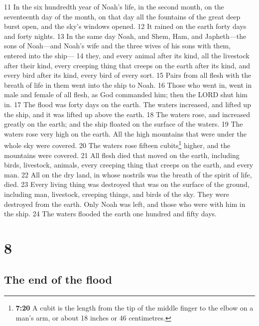{11} In the six hundredth year of Noah's life, in the second month, on
the seventeenth day of the month, on that day all the fountains of the
great deep burst open, and the sky's windows opened. {12} It rained on
the earth forty days and forty nights. {13} In the same day Noah, and
Shem, Ham, and Japheth---the sons of Noah---and Noah's wife and the
three wives of his sons with them, entered into the ship--- {14} they,
and every animal after its kind, all the livestock after their kind,
every creeping thing that creeps on the earth after its kind, and every
bird after its kind, every bird of every sort. {15} Pairs from all flesh
with the breath of life in them went into the ship to Noah. {16} Those
who went in, went in male and female of all flesh, as God commanded him;
then the LORD shut him in. {17} The flood was forty days on the earth.
The waters increased, and lifted up the ship, and it was lifted up above
the earth. {18} The waters rose, and increased greatly on the earth; and
the ship floated on the surface of the waters. {19} The waters rose very
high on the earth. All the high mountains that were under the whole sky
were covered. {20} The waters rose fifteen cubits\footnote{\textbf{7:20}
  A cubit is the length from the tip of the middle finger to the elbow
  on a man's arm, or about 18 inches or 46 centimetres.} higher, and the
mountains were covered. {21} All flesh died that moved on the earth,
including birds, livestock, animals, every creeping thing that creeps on
the earth, and every man. {22} All on the dry land, in whose nostrils
was the breath of the spirit of life, died. {23} Every living thing was
destroyed that was on the surface of the ground, including man,
livestock, creeping things, and birds of the sky. They were destroyed
from the earth. Only Noah was left, and those who were with him in the
ship. {24} The waters flooded the earth one hundred and fifty days.

\hypertarget{section-7}{%
\section{8}\label{section-7}}

\hypertarget{the-end-of-the-flood}{%
\subsection{The end of the flood}\label{the-end-of-the-flood}}

